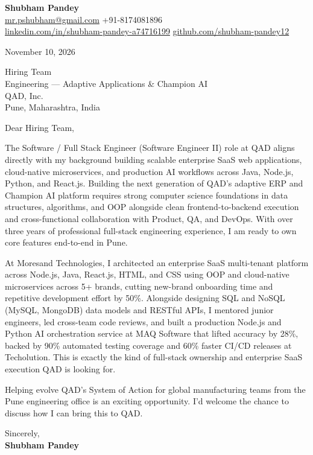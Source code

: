 \documentclass[a4paper,11pt]{article}
\begin{document}
\textbf{\Large Shubham Pandey}\\
\href{mailto:mr.pshubham@gmail.com}{mr.pshubham@gmail.com} \quad +91-8174081896\\
\href{https://www.linkedin.com/in/shubham-pandey-a74716199/}{linkedin.com/in/shubham-pandey-a74716199} \quad
\href{https://github.com/shubham-pandey12}{github.com/shubham-pandey12}

\vspace{1em}
November 10, 2026

\vspace{1em}
Hiring Team\\
Engineering --- Adaptive Applications \& Champion AI\\
QAD, Inc.\\
Pune, Maharashtra, India

\vspace{1em}
Dear Hiring Team,

The Software / Full Stack Engineer (Software Engineer II) role at QAD aligns directly with my background building scalable enterprise SaaS web applications, cloud-native microservices, and production AI workflows across Java, Node.js, Python, and React.js. Building the next generation of QAD's adaptive ERP and Champion AI platform requires strong computer science foundations in data structures, algorithms, and OOP alongside clean frontend-to-backend execution and cross-functional collaboration with Product, QA, and DevOps. With over three years of professional full-stack engineering experience, I am ready to own core features end-to-end in Pune.

At Moresand Technologies, I architected an enterprise SaaS multi-tenant platform across Node.js, Java, React.js, HTML, and CSS using OOP and cloud-native microservices across 5+ brands, cutting new-brand onboarding time and repetitive development effort by 50\%. Alongside designing SQL and NoSQL (MySQL, MongoDB) data models and RESTful APIs, I mentored junior engineers, led cross-team code reviews, and built a production Node.js and Python AI orchestration service at MAQ Software that lifted accuracy by 28\%, backed by 90\% automated testing coverage and 60\% faster CI/CD releases at Techolution. This is exactly the kind of full-stack ownership and enterprise SaaS execution QAD is looking for.

Helping evolve QAD's System of Action for global manufacturing teams from the Pune engineering office is an exciting opportunity. I'd welcome the chance to discuss how I can bring this to QAD.

\vspace{1em}
Sincerely,\\[0.5em]
\textbf{Shubham Pandey}
\end{document}
